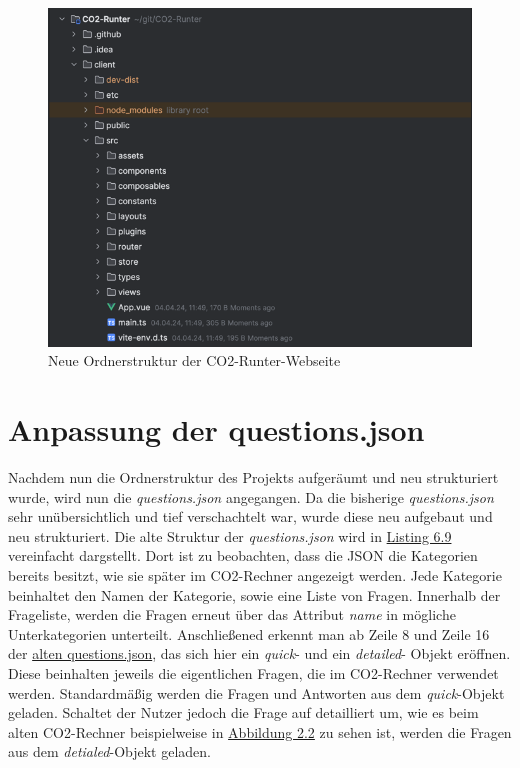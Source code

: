 \begin{figure}[h]
    \centering
    \includegraphics[width=1\textwidth]{images/06/ordnerstruktur_projekt.png}
    \caption{Neue Ordnerstruktur der CO2-Runter-Webseite}
    \label{fig:ordnerstruktur_neu}
\end{figure}

\section{Anpassung der questions.json}
\label{sec:anpassung-der-questions-json}

Nachdem nun die Ordnerstruktur des Projekts aufgeräumt und neu strukturiert wurde, wird nun die \textit{questions.json} angegangen. Da die bisherige \textit{questions.json} sehr unübersichtlich und tief verschachtelt war, wurde diese neu aufgebaut und neu strukturiert. Die alte Struktur der \textit{questions.json} wird in \hyperref[lst:questions-json-old]{Listing 6.9} vereinfacht dargstellt. Dort ist zu beobachten, dass die \acs{JSON} die Kategorien bereits besitzt, wie sie später im CO2-Rechner angezeigt werden. Jede Kategorie beinhaltet den Namen der Kategorie, sowie eine Liste von Fragen. Innerhalb der Frageliste, werden die Fragen erneut über das Attribut \textit{name} in mögliche Unterkategorien unterteilt. Anschließened erkennt man ab Zeile 8 und Zeile 16 der \hyperref[lst:questions-json-old]{alten questions.json}, das sich hier ein \textit{quick}- und ein \textit{detailed}- Objekt eröffnen. Diese beinhalten jeweils die eigentlichen Fragen, die im CO2-Rechner verwendet werden. Standardmäßig werden die Fragen und Antworten aus dem \textit{quick}-Objekt geladen. Schaltet der Nutzer jedoch die Frage auf detailliert um, wie es beim alten CO2-Rechner beispielweise in \hyperref[fig:co2runterapp-rechner]{Abbildung 2.2} zu sehen ist, werden die Fragen aus dem \textit{detialed}-Objekt geladen.

